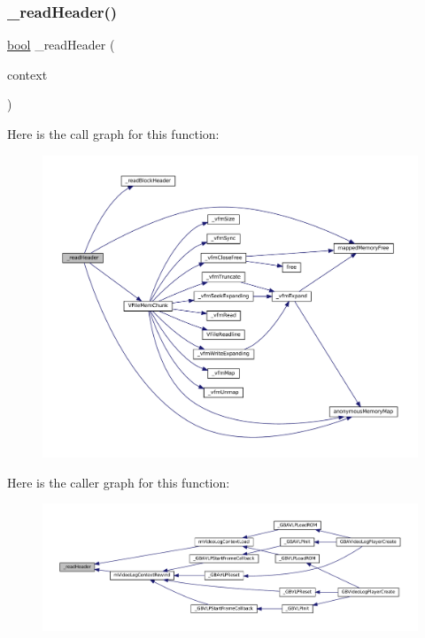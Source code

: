 \subsubsection{\texorpdfstring{\+\_\+read\+Header()}{\_readHeader()}}
{\footnotesize\ttfamily \mbox{\hyperlink{libretro_8h_a4a26dcae73fb7e1528214a068aca317e}{bool}} \+\_\+read\+Header (\begin{DoxyParamCaption}\item[{struct m\+Video\+Log\+Context $\ast$}]{context }\end{DoxyParamCaption})}

Here is the call graph for this function\+:
\nopagebreak
\begin{figure}[H]
\begin{center}
\leavevmode
\includegraphics[width=350pt]{video-logger_8c_ac5911963671b26f1d64938bcf9ac6648_cgraph}
\end{center}
\end{figure}
Here is the caller graph for this function\+:
\nopagebreak
\begin{figure}[H]
\begin{center}
\leavevmode
\includegraphics[width=350pt]{video-logger_8c_ac5911963671b26f1d64938bcf9ac6648_icgraph}
\end{center}
\end{figure}
\mbox{\label{video-logger_8c_a18aadf02a7a40b898d4b6d362af0e06a}} 
